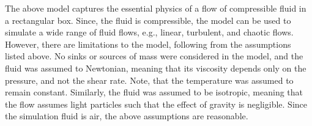 The above model captures the essential physics of a flow of compressible fluid in a rectangular box. Since, the fluid is compressible, the model can be used to simulate a wide range of fluid flows, e.g., linear, turbulent, and chaotic flows.
However, there are limitations to the model, following from the assumptions listed above. No sinks or sources of mass were considered in the model, and the fluid was assumed to Newtonian, meaning that its viscosity depends only on the pressure, and not the shear rate. Note, that the temperature was assumed to remain constant. Similarly, the fluid was assumed to be isotropic, meaning that the flow assumes light particles such that the effect of gravity is negligible. Since the simulation fluid is air, the above assumptions are reasonable. 